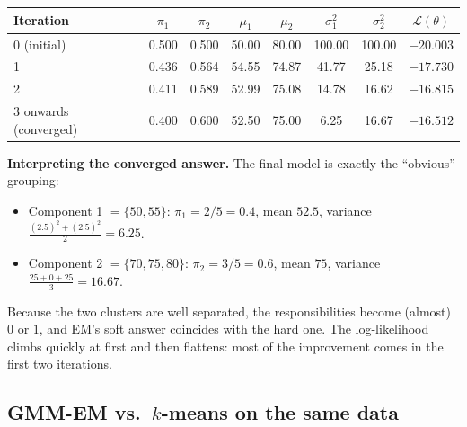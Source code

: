 \documentclass[11pt,a4paper]{article}
\newcommand{\LL}{\mathcal{L}}
\begin{document}
\begin{center}
\begin{tabular}{@{}lccccccc@{}}
\toprule
Iteration & $\pi_1$ & $\pi_2$ & $\mu_1$ & $\mu_2$ & $\sigma_1^2$ & $\sigma_2^2$ & $\LL(\theta)$\\
\midrule
0 (initial) & 0.500 & 0.500 & 50.00 & 80.00 & 100.00 & 100.00 & $-20.003$\\
1 & 0.436 & 0.564 & 54.55 & 74.87 & 41.77 & 25.18 & $-17.730$\\
2 & 0.411 & 0.589 & 52.99 & 75.08 & 14.78 & 16.62 & $-16.815$\\
3 onwards (converged) & 0.400 & 0.600 & 52.50 & 75.00 & 6.25 & 16.67 & $-16.512$\\
\bottomrule
\end{tabular}
\end{center}

\begin{center}
\end{center}

\textbf{Interpreting the converged answer.} The final model is exactly the ``obvious'' grouping:
\begin{itemize}[nosep]
\item Component 1 $=\{50,55\}$: $\pi_1=2/5=0.4$, mean $52.5$, variance $\frac{(2.5)^2+(2.5)^2}{2}=6.25$.
\item Component 2 $=\{70,75,80\}$: $\pi_2=3/5=0.6$, mean $75$, variance $\frac{25+0+25}{3}=16.67$.
\end{itemize}
Because the two clusters are well separated, the responsibilities become (almost) $0$ or $1$, and EM's soft answer coincides with the hard one. The log-likelihood climbs quickly at first and then flattens: most of the improvement comes in the first two iterations.

\subsection{GMM-EM vs.\ \texorpdfstring{$k$}{k}-means on the same data}
\end{document}
